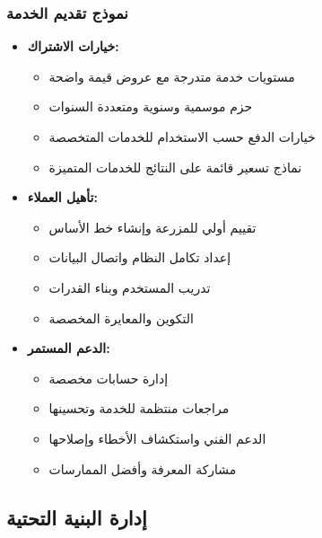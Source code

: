 \subsubsection{نموذج تقديم الخدمة}
\begin{itemize}
    \item \textbf{خيارات الاشتراك:}
    \begin{itemize}
        \item مستويات خدمة متدرجة مع عروض قيمة واضحة
        \item حزم موسمية وسنوية ومتعددة السنوات
        \item خيارات الدفع حسب الاستخدام للخدمات المتخصصة
        \item نماذج تسعير قائمة على النتائج للخدمات المتميزة
    \end{itemize}
    
    \item \textbf{تأهيل العملاء:}
    \begin{itemize}
        \item تقييم أولي للمزرعة وإنشاء خط الأساس
        \item إعداد تكامل النظام واتصال البيانات
        \item تدريب المستخدم وبناء القدرات
        \item التكوين والمعايرة المخصصة
    \end{itemize}
    
    \item \textbf{الدعم المستمر:}
    \begin{itemize}
        \item إدارة حسابات مخصصة
        \item مراجعات منتظمة للخدمة وتحسينها
        \item الدعم الفني واستكشاف الأخطاء وإصلاحها
        \item مشاركة المعرفة وأفضل الممارسات
    \end{itemize}
\end{itemize}

\subsection{إدارة البنية التحتية}

